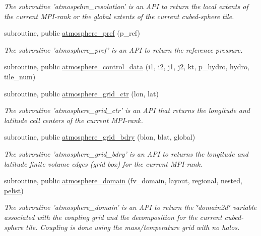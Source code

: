 \begin{DoxyCompactItemize}
\begin{DoxyCompactList}\small\item\em The subroutine 'atmospehre\-\_\-resolution' is an A\-P\-I to return the local extents of the current M\-P\-I-\/rank or the global extents of the current cubed-\/sphere tile. \end{DoxyCompactList}\item 
subroutine, public \hyperlink{classatmosphere__mod_a15f14a6344439b29298bfb2b37d9c694}{atmosphere\-\_\-pref} (p\-\_\-ref)
\begin{DoxyCompactList}\small\item\em The subroutine 'atmosphere\-\_\-pref' is an A\-P\-I to return the reference pressure. \end{DoxyCompactList}\item 
subroutine, public \hyperlink{classatmosphere__mod_adc8bdf1db2df9551cfc25a0c1f7b1385}{atmosphere\-\_\-control\-\_\-data} (i1, i2, j1, j2, kt, p\-\_\-hydro, hydro, tile\-\_\-num)
\item 
subroutine, public \hyperlink{classatmosphere__mod_a9a51c2f1c5e1cf01dcf112478ecf8cf4}{atmosphere\-\_\-grid\-\_\-ctr} (lon, lat)
\begin{DoxyCompactList}\small\item\em The subroutine 'atmosphere\-\_\-grid\-\_\-ctr' is an A\-P\-I that returns the longitude and latitude cell centers of the current M\-P\-I-\/rank. \end{DoxyCompactList}\item 
subroutine, public \hyperlink{classatmosphere__mod_a3f2bb9d476f9525e20747fd29951dde5}{atmosphere\-\_\-grid\-\_\-bdry} (blon, blat, global)
\begin{DoxyCompactList}\small\item\em The subroutine 'atmosphere\-\_\-grid\-\_\-bdry' is an A\-P\-I to returns the longitude and latitude finite volume edges (grid box) for the current M\-P\-I-\/rank. \end{DoxyCompactList}\item 
subroutine, public \hyperlink{classatmosphere__mod_a35547644843aec32773bc727b07252de}{atmosphere\-\_\-domain} (fv\-\_\-domain, layout, regional, nested, \hyperlink{classatmosphere__mod_a40b6e75a5e8c4bafc747edc08eceaed5}{pelist})
\begin{DoxyCompactList}\small\item\em The subroutine 'atmosphere\-\_\-domain' is an A\-P\-I to return the \char`\"{}domain2d\char`\"{} variable associated with the coupling grid and the decomposition for the current cubed-\/sphere tile.  Coupling is done using the mass/temperature grid with no halos. \end{DoxyCompactList}\item 

\end{DoxyCompactItemize}

